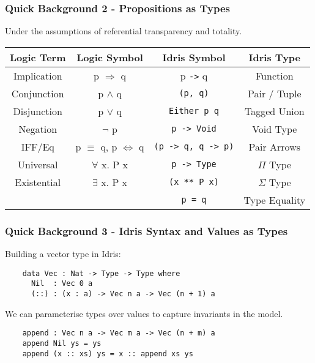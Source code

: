 \documentclass{beamer}
\begin{document}
\begin{frame}[fragile]
  \frametitle{Quick Background 2 - Propositions as Types}
  Under the assumptions of referential transparency and totality.
     \begin{table}[h!]
    \begin{tabular}{c|c|c|c}
    \textbf{Logic Term} & \textbf{Logic Symbol} & 
    \textbf{Idris Symbol} & \textbf{Idris Type} \\
    \hline
      Implication & p $\Rightarrow$ q & p \texttt{->} q
      & Function \\
      Conjunction & p $\land$ q & \texttt{(p, q)} 
      & Pair / Tuple \\
      Disjunction & p $\lor$ q & \texttt{Either p q}
      & Tagged Union\\
      Negation & $\lnot$ p & \texttt{p -> Void} &
      Void Type \\
      IFF/Eq & p $\equiv$ q, p $\iff$ q & 
        \texttt{(p -> q, q -> p)} 
      & Pair Arrows \\
      Universal & $\forall$ x. P x & 
      \texttt{p -> Type} & $\Pi$ Type \\
      Existential & $\exists$ x. P x 
      & \texttt{(x ** P x)} & $\Sigma$ Type \\
      \hline
       & & \texttt{p = q} & Type Equality
    \end{tabular}
  \end{table}
\end{frame}

\begin{frame}[fragile]
  \frametitle{Quick Background 3 - Idris Syntax and Values as Types}
  Building a vector type in Idris: 
  \begin{verbatim}
    data Vec : Nat -> Type -> Type where
      Nil  : Vec 0 a
      (::) : (x : a) -> Vec n a -> Vec (n + 1) a
  \end{verbatim}
  We can parameterise types over values to capture invariants in 
  the model.
  \begin{verbatim}
    append : Vec n a -> Vec m a -> Vec (n + m) a
    append Nil ys = ys
    append (x :: xs) ys = x :: append xs ys 
  \end{verbatim}
\end{frame}
\end{document}
